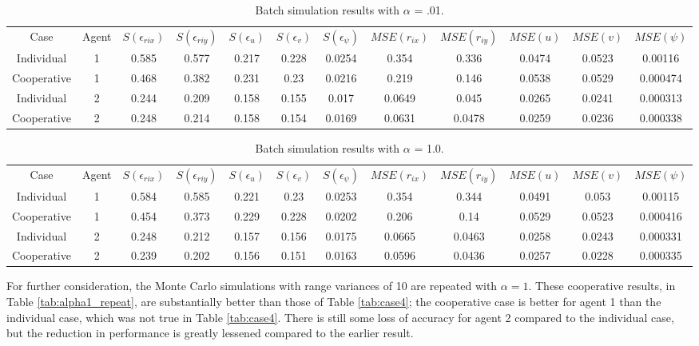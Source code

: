 \documentclass{aiaa-tc}
\begin{document}
\begin{table}[tb!]
\scriptsize
\centering
\begin{tabular}{c|c|c|c|c|c|c|c|c|c|c|c|}
Case & Agent & $S(\epsilon_{rix})$ & $S(\epsilon_{riy})$ & $S(\epsilon_{u})$ & $S(\epsilon_{v})$ & $S(\epsilon_{\psi})$ & $MSE(r_{ix})$ & $MSE(r_{iy})$ & $MSE(u)$ & $MSE(v)$ & $MSE(\psi)$ \\
Individual & 1& 0.585& 0.577& 0.217& 0.228& 0.0254& 0.354& 0.336& 0.0474& 0.0523& 0.00116 \\
Cooperative & 1& 0.468& 0.382& 0.231& 0.23& 0.0216& 0.219& 0.146& 0.0538& 0.0529& 0.000474 \\
Individual & 2& 0.244& 0.209& 0.158& 0.155& 0.017& 0.0649& 0.045& 0.0265& 0.0241& 0.000313 \\
Cooperative & 2& 0.248& 0.214& 0.158& 0.154& 0.0169& 0.0631& 0.0478& 0.0259& 0.0236& 0.000338 \\
\end{tabular}
\caption{Batch simulation results with $\alpha$ = .01.}
\label{tab:alpha1e-2}
\end{table}

\begin{table}[tb!]
\scriptsize
\centering
\begin{tabular}{c|c|c|c|c|c|c|c|c|c|c|c|}
Case & Agent & $S(\epsilon_{rix})$ & $S(\epsilon_{riy})$ & $S(\epsilon_{u})$ & $S(\epsilon_{v})$ & $S(\epsilon_{\psi})$ & $MSE(r_{ix})$ & $MSE(r_{iy})$ & $MSE(u)$ & $MSE(v)$ & $MSE(\psi)$ \\
Individual & 1& 0.584& 0.585& 0.221& 0.23& 0.0253& 0.354& 0.344& 0.0491& 0.053& 0.00115 \\
Cooperative & 1& 0.454& 0.373& 0.229& 0.228& 0.0202& 0.206& 0.14& 0.0529& 0.0523& 0.000416 \\
Individual & 2& 0.248& 0.212& 0.157& 0.156& 0.0175& 0.0665& 0.0463& 0.0258& 0.0243& 0.000331 \\
Cooperative & 2& 0.239& 0.202& 0.156& 0.151& 0.0163& 0.0596& 0.0436& 0.0257& 0.0228& 0.000335 \\
\end{tabular}
\caption{Batch simulation results with $\alpha$ = 1.0.}
\label{tab:alpha1}
\end{table}

For further consideration, the Monte Carlo simulations with range variances of 10 are repeated with $\alpha = 1$. These cooperative results, in Table \ref{tab:alpha1_repeat}, are substantially better than those of Table \ref{tab:case4}; the cooperative case is better for agent 1 than the individual case, which was not true in Table \ref{tab:case4}. There is still some loss of accuracy for agent 2 compared to the individual case, but the reduction in performance is greatly lessened compared to the earlier result.
\end{document}
